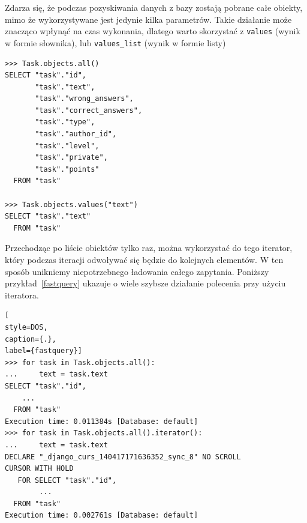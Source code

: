 \documentclass[oneside,polski,logo,indent]{amuthesis}
\begin{document}
Zdarza się, że podczas pozyskiwania danych z bazy zostają pobrane całe obiekty, mimo że wykorzystywane jest jedynie kilka parametrów. Takie działanie może znacząco wpłynąć na czas wykonania, dlatego warto skorzystać z \texttt{values} (wynik w formie słownika), lub \texttt{values\_list} (wynik w formie listy)
\begin{lstlisting}[style=DOS]
>>> Task.objects.all()
SELECT "task"."id",
       "task"."text",
       "task"."wrong_answers",
       "task"."correct_answers",
       "task"."type",
       "task"."author_id",
       "task"."level",
       "task"."private",
       "task"."points"
  FROM "task"

>>> Task.objects.values("text")
SELECT "task"."text"
  FROM "task"
\end{lstlisting}
Przechodząc po liście obiektów tylko raz, można wykorzystać do tego iterator, który podczas iteracji odwoływać się będzie do kolejnych elementów. W ten sposób unikniemy niepotrzebnego ładowania całego zapytania. Poniższy przykład~\ref{fastquery} ukazuje o wiele szybsze działanie polecenia przy użyciu iteratora.
\begin{lstlisting}[
style=DOS,
caption={.},
label={fastquery}]
>>> for task in Task.objects.all():
...     text = task.text
SELECT "task"."id",
	...
  FROM "task"
Execution time: 0.011384s [Database: default]
>>> for task in Task.objects.all().iterator():
...     text = task.text
DECLARE "_django_curs_140417171636352_sync_8" NO SCROLL
CURSOR WITH HOLD
   FOR SELECT "task"."id",
		...
  FROM "task"
Execution time: 0.002761s [Database: default]
\end{lstlisting}
\end{document}
